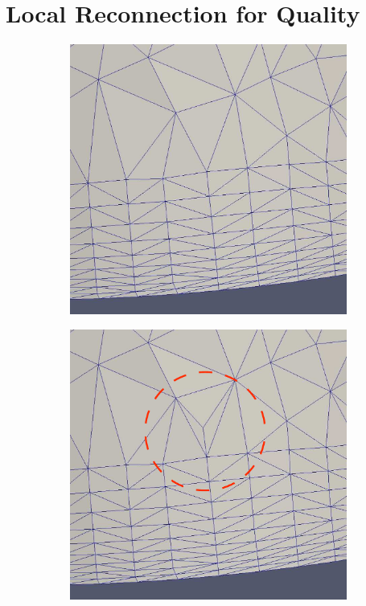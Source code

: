 \section{Local Reconnection for Quality}

\begin{figure}
\centering
\begin{subfigure}{.5\textwidth}
  \centering
  \includegraphics[width=.8\linewidth]{img/m1/point-insertion-swapping/initial.eps}
  \caption{}
  \label{point-insert1}
\end{subfigure}%
\begin{subfigure}{.5\textwidth}
  \centering
  \includegraphics[width=.8\linewidth]{img/m1/point-insertion-swapping/point-inserted.eps}

\end{subfigure}
\end{figure}
